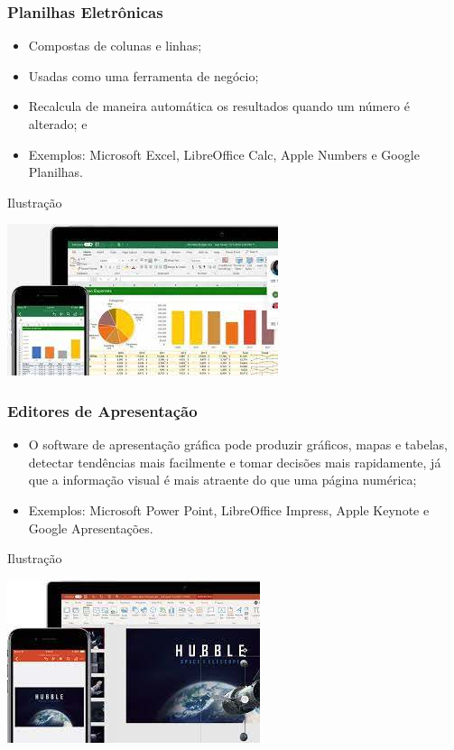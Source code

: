 \documentclass[aspectratio=169]{beamer} %
\begin{document}
\begin{frame}
	\frametitle{Planilhas Eletrônicas}
		
	\begin{itemize}
		\item Compostas de colunas e linhas;
		\item Usadas como uma ferramenta de negócio;
		\item Recalcula de maneira automática os resultados quando um número é alterado; e
		\item Exemplos: Microsoft Excel, LibreOffice Calc, Apple Numbers e Google Planilhas.
	\end{itemize}\vfill
	
	\begin{exampleblock}{Ilustra\c cão}
		\begin{center}
			\includegraphics[scale=0.4]{img/excel}
		\end{center}		
	\end{exampleblock}
\end{frame}

\begin{frame}
	\frametitle{Editores de Apresenta\c cão}
		
	\begin{itemize}
		\item O software de apresentação gráfica pode produzir gráficos, mapas e tabelas, detectar tendências mais facilmente e tomar decisões mais rapidamente, já que a informação visual é mais atraente do que uma página numérica;
		\item Exemplos: Microsoft Power Point, LibreOffice Impress, Apple Keynote e Google Apresenta\c cões.
	\end{itemize}\vfill
	
	\begin{exampleblock}{Ilustra\c cão}
		\begin{center}
			\includegraphics[scale=0.4]{img/powerpoint}
		\end{center}
	\end{exampleblock}
\end{frame}
\end{document}
